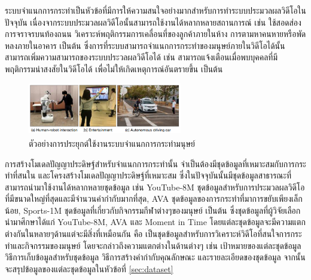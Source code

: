 ระบบจำแนกการกระทำเป็นหัวข้อที่มีการให้ความสนใจอย่างมากสำหรับการทำระบบประมวลผลวิดีโอในปัจจุบัน เนื่องจากระบบประมวลผลวิดีโอนั้นสามารถใช้งานได้หลากหลายสถานการณ์ เช่น ใช้สอดส่องการจราจรบนท้องถนน
วิเคราะห์พฤติกรรมการเคลื่อนที่ของลูกค้าภายในห้าง การตามหาคนหายหรือพัดหลงภายในอาคาร เป็นต้น ซึ่งการที่ระบบสามารถจำแนกการกระทำของมนุษย์ภายในวิดีโอได้นั้นสามารถเพิ่มความสามารถของระบบประวลผลวิดีโอได้
เช่น สามารถแจ้งเตือนเมื่อพบบุคคลที่มีพฤติกรรมน่าสงสัยในวิดีโอได้ เพื่อไม่ให้เกิดเหตุการณ์อันตรายขึ้น เป็นต้น

\begin{figure}[!ht]
	\centering
	\includegraphics[width=0.6\textwidth]{chapter2/images/video_analytics_ex.png}
	\caption{ตัวอย่างการประยุกต์ใช้งานระบบจำแนกการกระทำมนุษย์\textsuperscript{\cite{kong2018human}}}
	\label{fig:actioncls_ex}
\end{figure}

การสร้างโมเดลปัญญาประดิษฐ์สำหรับจำแนกการกระทำนั้น จำเป็นต้องมีชุดข้อมูลที่เหมาะสมกับการกระทำที่สนใน และโครงสร้างโมเดลปัญญาประดิษฐ์ที่เหมาะสม
ซึ่งในปัจจุบันนั้นมีชุดข้อมูลสาธารณะที่สามารถนำมาใช้งานได้หลากหลายชุดข้อมูล เช่น YouTube-8M ชุดข้อมูลสำหรับการประมวลผลวิดีโอที่มีขนาดใหญ่ที่สุดและมีจำนวนคำกำกับมากที่สุด, 
AVA ชุดข้อมูลของการกระทำที่มาการขยับเพียงเล็กน้อย, Sports-1M ชุดข้อมูลที่เกี่ยวกับกิจกรรมกีฬาต่างๆของมนุษย์ เป็นต้น ซึ่งชุดข้อมูลที่ผู้วิจัยเลือกนำมาศึกษาได้แก่ YouTube-8M, AVA และ Moment in Time
โดยแต่ละชุดข้อมูลจะมีความแตกต่างกันในหลายๆด้านแต่จะมีสิ่งที่เหมือนกัน คือ เป็นชุดข้อมูลสำหรับการวิเคราะห์วิดีโอที่สนใจการกระทำและกิจกรรมของมนุษย์ โดยจะกล่าวถึงความแตกต่างในด้านต่างๆ 
เช่น เป้าหมายของแต่ละชุดข้อมูล วิธีการเก็บข้อมูลสำหรับชุดข้อมูล วิธีการสร้างคำกำกับคุณลักษณะ และรายละเอียดของชุดข้อมูล จากนั้นจะสรุปข้อมูลของแต่ละชุดข้อมูลในหัวข้อที่ \ref{sec:dataset}